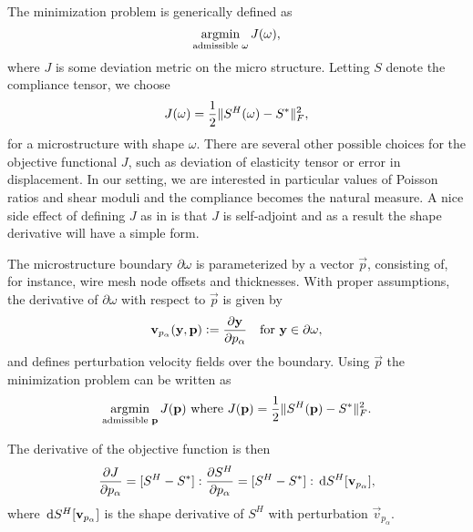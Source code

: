 \documentclass[twocolumn,10pt]{article}
\begin{document}
The minimization problem is generically defined as 
\begin{equation}
  \label{eqn:min}
  \operatorname*{argmin}_\text{admissible $\omega$} J(\omega),
\end{equation}
where $J$ is some deviation metric on the micro structure. Letting $S$
denote the compliance tensor, we choose
\begin{equation}
  \label{eqn:compObjective}
  J(\omega) = \frac{1}{2}\lVert S^H(\omega) - S^*\rVert^2_F,
\end{equation}
for a microstructure with shape $\omega$. There are several other
possible choices for the objective functional $J$, such as deviation
of elasticity tensor or error in displacement. In our setting, we are
interested in particular values of Poisson ratios and shear moduli
and the compliance becomes the natural measure. A nice side effect of
defining $J$ as in  is that $J$ is self-adjoint
and as a result the shape derivative will have a simple form.

The microstructure boundary $\partial \omega$ is parameterized by a
vector $\vec{p}$, consisting of, for instance, wire mesh node offsets
and thicknesses. With proper assumptions, the derivative of $\partial
\omega$ with respect to $\vec{p}$ is given by
\begin{equation}
  \mathbf v_{p_\alpha}(\mathbf y,\mathbf p) \vcentcolon=
  \frac{\partial \mathbf y}{\partial p_\alpha}\quad\text{for } \mathbf y\in \partial\omega,
\end{equation}
and defines perturbation velocity fields over the boundary. Using
$\vec{p}$ the minimization problem can be written as
\begin{equation}
  \label{eqn:minParam}
  \operatorname*{argmin}_\text{admissible $\mathbf p$} J(\mathbf p)\text{ where }
  J(\mathbf p) = \frac{1}{2}\lVert S^H(\mathbf p) - S^*\rVert^2_F.
\end{equation}

The derivative of the objective function is then
\begin{equation}
  \label{eqn:paramJacobian}
  \frac{\partial J}{\partial p_\alpha} = [S^H - S^*]: \frac{\partial S^H}{\partial p_\alpha} = [S^H - S^*]: \, \mathrm{d} S^H[\mathbf v_{p_\alpha}],
\end{equation}
where $\, \mathrm{d} S^H[\mathbf v_{p_\alpha}]$ is the shape derivative of $S^H$
with perturbation $\vec{v}_{p_{\alpha}}$.
\end{document}
